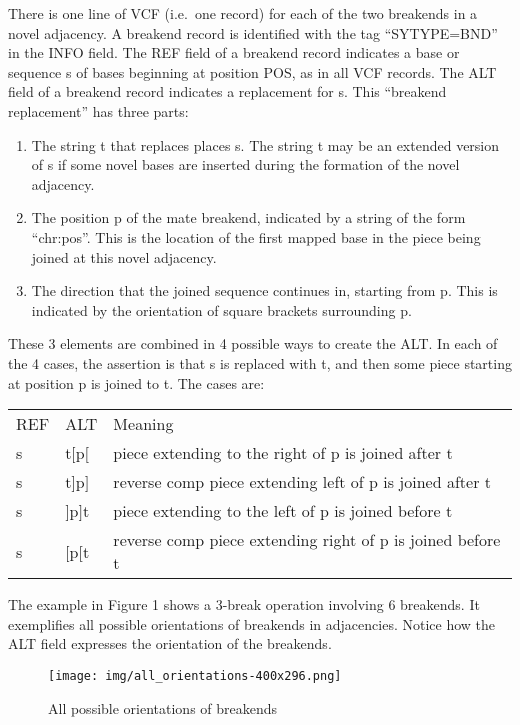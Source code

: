 \documentclass[8pt]{article}
\begin{document}
There is one line of VCF (i.e.\ one record) for each of the two breakends in a novel adjacency. A breakend record is identified with the tag ``SYTYPE=BND'' in the INFO field. The REF field of a breakend record indicates a base or sequence s of bases beginning at position POS, as in all VCF records. The ALT field of a breakend record indicates a replacement for s. This ``breakend replacement'' has three parts:
\begin{enumerate}
  \item The string t that replaces places s. The string t may be an extended version of s if some novel bases are inserted during the formation of the novel adjacency.
  \item The position p of the mate breakend, indicated by a string of the form ``chr:pos''. This is the location of the first mapped base in the piece being joined at this novel adjacency.
  \item The direction that the joined sequence continues in, starting from p. This is indicated by the orientation of square brackets surrounding p.

\end{enumerate}
These 3 elements are combined in 4 possible ways to create the ALT. In each of the 4 cases, the assertion is that s is replaced with t, and then some piece starting at position p is joined to t. The cases are:

\vspace{0.3cm}
\begin{tabular}{ l l l }
REF & ALT & Meaning \\
s & t$[$p$[$ & piece extending to the right of p is joined after t \\
s & t$]$p$]$ & reverse comp piece extending left of p is joined after t \\
s & $]$p$]$t & piece extending to the left of p is joined before t \\
s & $[$p$[$t & reverse comp piece extending right of p is joined before t \\
\end{tabular}
\vspace{0.3cm}

The example in Figure 1 shows a 3-break operation involving 6 breakends. It exemplifies all possible orientations of breakends in adjacencies. Notice how the ALT field expresses the orientation of the breakends.

\begin{figure}[ht]
\centering
\texttt{[image: img/all\_orientations-400x296.png]}
\caption{All possible orientations of breakends}
\end{figure}
\end{document}
